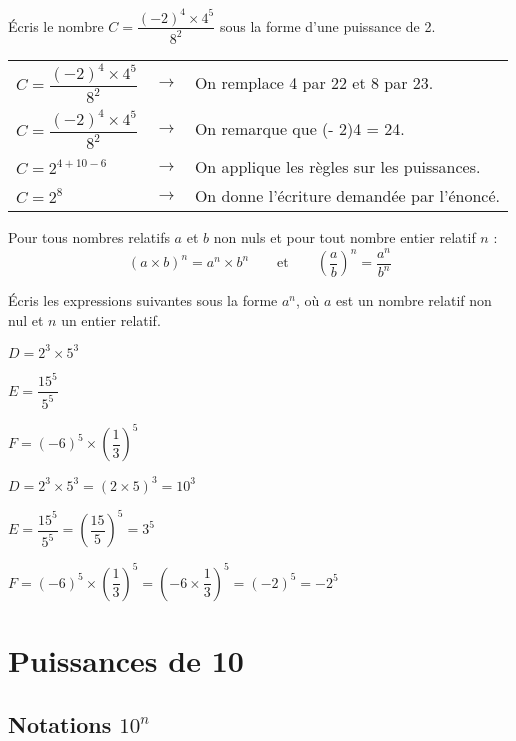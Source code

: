 \begin{exemple*1}
Écris le nombre $C=\dfrac{(-2)^4\times 4^5}{8^2}$ sous la forme d'une puissance de 2.

\correction

\begin{tabular}{lcl}
$C=\dfrac{(-2)^4\times 4^5}{8^2}$ & $\longrightarrow$ & On remplace 4 par 22 et 8 par 23. \\
$C=\dfrac{(-2)^4\times 4^5}{8^2}$ & $\longrightarrow$ & On remarque que (- 2)4 = 24. \\
$C=2^{4+10-6}$ & $\longrightarrow$ & On applique les règles sur les puissances. \\
$C=2^8$ & $\longrightarrow$ & On donne l'écriture demandée par l'énoncé.\\
\end{tabular}
\end{exemple*1}



\begin{aconnaitre}
Pour tous nombres relatifs $a$ et $b$ non nuls et pour tout nombre entier relatif $n$ :
\[ (a\times b)^n = a^n \times b^n  \qquad \text{et} \qquad \left(\dfrac{a}{b}\right)^n = \dfrac{a^n}{b^n} \]
\end{aconnaitre}


\begin{exemple*1}
Écris les expressions suivantes sous la forme $a^n$, où $a$ est un nombre relatif non nul et $n$ un entier relatif.

$D=2^3 \times 5^3$

$E=\dfrac{15^5}{5^5}$

$F=(-6)^5 \times \left(\dfrac{1}{3}\right)^5$

\correction

$D=2^3 \times 5^3 = (2\times 5)^3 = 10^3$

$E=\dfrac{15^5}{5^5} = \left(\dfrac{15}{5}\right)^5 = 3^5$

$F=(-6)^5 \times \left(\dfrac{1}{3}\right)^5 = \left(-6\times \dfrac{1}{3}\right)^5 = (-2)^5 = -2^5$

\end{exemple*1}





\section{Puissances de 10}

\subsection{Notations $10^n$}

